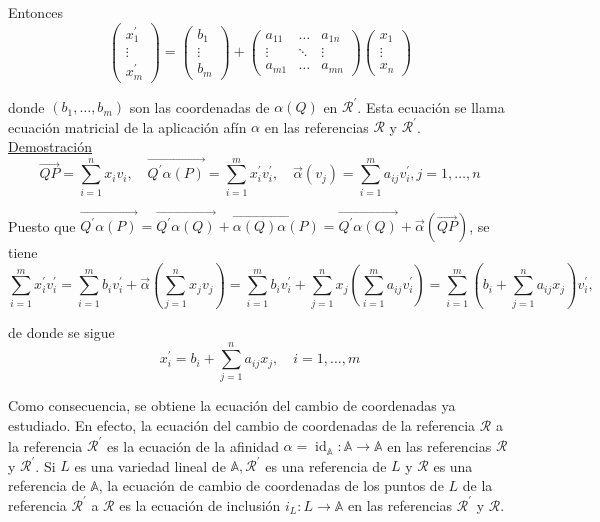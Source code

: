 \documentclass[12pt, a4paper, ones, notitlepage, openany,titlepage]{article}
\newcommand{\demostracion}{\noindent\underline{Demostración}}
\begin{document}
\noindent Entonces
$$
\left(\begin{array}{c}
x_{1}^{\prime} \\
\vdots \\
x_{m}^{\prime}
\end{array}\right)=\left(\begin{array}{c}
b_{1} \\
\vdots \\
b_{m}
\end{array}\right)+\left(\begin{array}{ccc}
a_{11} & \ldots & a_{1 n} \\
\vdots & \ddots & \vdots \\
a_{m 1} & \ldots & a_{m n}
\end{array}\right)\left(\begin{array}{c}
x_{1} \\
\vdots \\
x_{n}
\end{array}\right)
$$

donde $\left(b_{1}, \ldots, b_{m}\right)$ son las coordenadas de $\alpha(Q)$ en $\mathcal{R}^{\prime}$. Esta ecuación se llama ecuación matricial de la aplicación afín $\alpha$ en las referencias $\mathcal{R}$ y $\mathcal{R}^{\prime}$.\\

\demostracion
$$
\overrightarrow{Q P}=\sum_{i=1}^{n} x_{i} v_{i}, \quad \overrightarrow{Q^{\prime} \alpha(P)}=\sum_{i=1}^{m} x_{i}^{\prime} v_{i}^{\prime}, \quad \vec{\alpha}\left(v_{j}\right)=\sum_{i=1}^{m} a_{i j} v_{i}^{\prime}, j=1, \ldots, n
$$

\noindent Puesto que $\overrightarrow{Q^{\prime} \alpha(P)}=\overrightarrow{Q^{\prime} \alpha(Q)}+\overrightarrow{\alpha(Q) \alpha(P)}=\overrightarrow{Q^{\prime} \alpha(Q)}+\vec{\alpha}(\overrightarrow{Q P})$, se tiene
$$
\sum_{i=1}^{m} x_{i}^{\prime} v_{i}^{\prime}=\sum_{i=1}^{m} b_{i} v_{i}^{\prime}+\vec{\alpha}\left(\sum_{j=1}^{n} x_{j} v_{j}\right)=\sum_{i=1}^{m} b_{i} v_{i}^{\prime}+\sum_{j=1}^{n} x_{j}\left(\sum_{i=1}^{m} a_{i j} v_{i}^{\prime}\right)=\sum_{i=1}^{m}\left(b_{i}+\sum_{j=1}^{n} a_{i j} x_{j}\right) v_{i}^{\prime},
$$

\noindent de donde se sigue
$$
x_{i}^{\prime}=b_{i}+\sum_{j=1}^{n} a_{i j} x_{j}, \quad i=1, \ldots, m
$$

Como consecuencia, se obtiene la ecuación del cambio de coordenadas ya estudiado. En efecto, la ecuación del cambio de coordenadas de la referencia $\mathcal{R}$ a la referencia $\mathcal{R}^{\prime}$ es la ecuación de la afinidad $\alpha=\operatorname{id}_{\mathbb{A}}: \mathbb{A} \rightarrow \mathbb{A}$ en las referencias $\mathcal{R}$ y $\mathcal{R}^{\prime}$. Si $L$ es una variedad lineal de $\mathbb{A}, \mathcal{R}^{\prime}$ es una referencia de $L$ y $\mathcal{R}$ es una referencia de $\mathbb{A}$, la ecuación de cambio de coordenadas de los puntos de $L$ de la referencia $\mathcal{R}^{\prime}$ a $\mathcal{R}$ es la ecuación de inclusión $i_{L}: L \rightarrow \mathbb{A}$ en las referencias $\mathcal{R}^{\prime}$ y $\mathcal{R}$.
\end{document}

